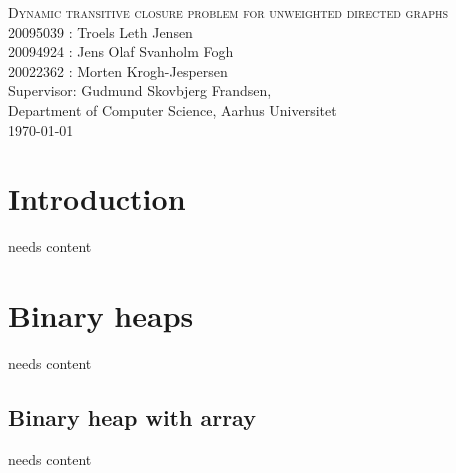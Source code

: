 \documentclass[12pt,a4paper,twoside,danish,article]{memoir}
\begin{document}
\frontmatter
\begin{titlingpage}
  \begin{center}
    \mbox{}\vfill
    \Huge{\textsc{Dynamic transitive closure problem for unweighted directed graphs}} \\
    \vspace{3cm}
    \Large{20095039 : Troels Leth Jensen \\ 20094924 : Jens Olaf Svanholm Fogh \\ 20022362 : Morten Krogh-Jespersen}\\
    \vspace{10cm}
    \vspace{1cm}
    Supervisor: Gudmund Skovbjerg Frandsen,\\ Department of Computer Science, Aarhus Universitet\\
    \today
    \vfill
    \vfill\mbox{}
  \tableofcontents*
  \end{center}
\end{titlingpage}

\mainmatter

\raggedbottom

\renewcommand{\labelitemi}{$\bullet$}

\renewcommand{\baselinestretch}{1.2}\normalsize %

\renewcommand{\chaptermark}[1]{\markboth{\thechapter.
    #1}{\thechapter. #1}} %
\renewcommand{\bibmark}{\markboth{\bibname}{\bibname}} %
\renewcommand{\tocmark}{\markboth{\contentsname}{\contentsname}}

\setlength{\parindent}{10pt} 


\chapter{Introduction}

needs content

\chapter{Binary heaps}

needs content

\section{Binary heap with array}

needs content
\end{document}
